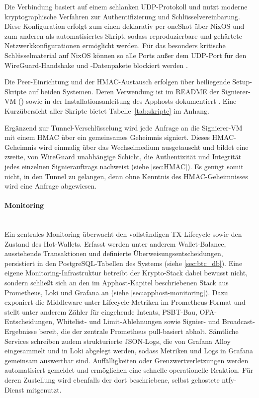 Die Verbindung basiert auf einem schlanken \ac{UDP}-Protokoll und nutzt moderne kryptographische Verfahren zur Authentifizierung und Schlüsselvereinbarung.
Diese Konfiguration erfolgt zum einen deklarativ per oneShot über NixOS und zum anderen als automatisiertes Skript, sodass reproduzierbare und gehärtete Netzwerkkonfigurationen ermöglicht werden.
Für das besonders kritische Schlüsselmaterial auf NixOS können so alle Ports außer dem \ac{UDP}-Port für den WireGuard-Handshake und -Datenpakete blockiert werden \cite{wireguard}.

Die Peer-Einrichtung und der HMAC-Austausch erfolgen über beiliegende Setup-Skripte auf beiden Systemen. Deren Verwendung ist im README der Signierer-\ac{VM} () sowie in der Installationsanleitung des Apphosts dokumentiert \cite{NixOsHot_github, Krypto_Basis_github}. Eine Kurzübersicht aller Skripte bietet Tabelle~\ref{tab:skripte} im Anhang.

Ergänzend zur Tunnel-Verschlüsselung wird jede Anfrage an die Signierer-\ac{VM} mit einem \ac{HMAC} über ein gemeinsames Geheimnis signiert. Dieses \ac{HMAC}-Geheimnis wird einmalig über das Wechselmedium ausgetauscht und bildet eine zweite, von WireGuard unabhängige Schicht, die Authentizität und Integrität jedes einzelnen Signierauftrags nachweist (siehe \ref{sec:HMAC}). Es genügt somit nicht, in den Tunnel zu gelangen, denn ohne Kenntnis des \ac{HMAC}-Geheimnisses wird eine Anfrage abgewiesen.


\paragraph{Monitoring} \mbox{}\\
Ein zentrales Monitoring überwacht den vollständigen \ac{TX}-Lifecycle sowie den Zustand des Hot-Wallets.
Erfasst werden unter anderem Wallet-Balance, ausstehende Transaktionen und definierte Überweisungsentscheidungen, persistiert in den PostgreSQL-Tabellen des Systems (siehe \ref{sec:btc_db}).
Eine eigene Monitoring-Infrastruktur betreibt der Krypto-Stack dabei bewusst nicht, sondern schließt sich an den im Apphost-Kapitel beschriebenen Stack aus
Prometheus, Loki und Grafana an (siehe \ref{sec:apphost-monitoring}). Dazu exponiert die Middleware unter  Lifecycle-Metriken im
Prometheus-Format und stellt unter anderem Zähler für eingehende Intents, \ac{PSBT}-Bau, \ac{OPA}-Entscheidungen, Whitelist- und Limit-Ablehnungen sowie
Signier- und Broadcast-Ergebnisse bereit, die der zentrale Prometheus pull-basiert abholt.
Sämtliche Services schreiben zudem strukturierte JSON-Logs, die von Grafana Alloy eingesammelt und in Loki abgelegt werden, sodass Metriken und Logs in
Grafana gemeinsam auswertbar sind. Auffälligkeiten oder Grenzwertverletzungen werden automatisiert gemeldet und ermöglichen eine schnelle operationelle
Reaktion. Für deren Zustellung wird ebenfalls der dort beschriebene, selbst gehostete ntfy-Dienst mitgenutzt.

